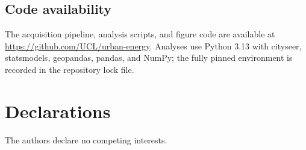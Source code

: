 \documentclass[pdflatex,sn-nature]{sn-jnl}
\begin{document}
\subsection*{Code availability}

The acquisition pipeline, analysis scripts, and figure code are available at \url{https://github.com/UCL/urban-energy}. Analyses use Python 3.13 with cityseer, statsmodels, geopandas, pandas, and NumPy; the fully pinned environment is recorded in the repository lock file. %

\section*{Declarations}

 The authors declare no competing interests.


\end{document}
